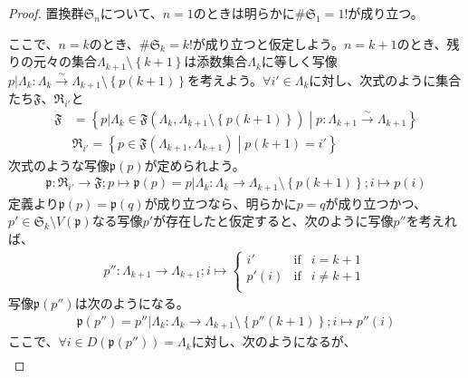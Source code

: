 \documentclass[dvipdfmx]{jsarticle}
\begin{document}
\begin{proof}
置換群$\mathfrak{S}_{n}$について、$n = 1$のときは明らかに${\#}\mathfrak{S}_{1} = 1!$が成り立つ。\par
ここで、$n = k$のとき、${\#}\mathfrak{S}_{k} = k!$が成り立つと仮定しよう。$n = k + 1$のとき、残りの元々の集合$\varLambda_{k + 1} \setminus \left\{ k + 1 \right\}$は添数集合$\varLambda_{k}$に等しく写像$p|\varLambda_{k}:\varLambda_{k}\overset{\sim}{\rightarrow}\varLambda_{k + 1} \setminus \left\{ p(k + 1) \right\}$を考えよう。$\forall i' \in \varLambda_{k}$に対し、次式のように集合たち$\mathfrak{F}$、$\mathfrak{R}_{i'}$と
\begin{align*}
\mathfrak{F} &= \left\{ p|\varLambda_{k}\in \mathfrak{F}\left( \varLambda_{k},\varLambda_{k + 1} \setminus \left\{ p(k + 1) \right\} \right) \middle| p:\varLambda_{k + 1}\overset{\sim}{\rightarrow}\varLambda_{k + 1} \right\}\\
&\mathfrak{R}_{i'} = \left\{ p \in \mathfrak{F}\left( \varLambda_{k + 1},\varLambda_{k + 1} \right) \middle| p(k + 1) = i' \right\}
\end{align*}
次式のような写像$\mathfrak{p}(p)$が定められよう。
\begin{align*}
\mathfrak{p:}\mathfrak{R}_{i'}\mathfrak{\rightarrow F;}p \mapsto \mathfrak{p}(p) = p|\varLambda_{k}:\varLambda_{k} \rightarrow \varLambda_{k + 1} \setminus \left\{ p(k + 1) \right\};i \mapsto p(i)
\end{align*}
定義より$\mathfrak{p}(p) = \mathfrak{p}(q)$が成り立つなら、明らかに$p = q$が成り立つかつ、$p' \in \mathfrak{S}_{k} \setminus V\left( \mathfrak{p} \right)$なる写像$p'$が存在したと仮定すると、次のように写像$p''$を考えれば、
\begin{align*}
p'':\varLambda_{k + 1} \rightarrow \varLambda_{k + 1};i \mapsto \left\{ \begin{matrix}
i' & \mathrm{if} & i = k + 1 \\
p'(i) & \mathrm{if} & i \neq k + 1 \\
\end{matrix} \right.\ 
\end{align*}
写像$\mathfrak{p}\left( p'' \right)$は次のようになる。
\begin{align*}
\mathfrak{p}\left( p'' \right) = p''|\varLambda_{k}:\varLambda_{k} \rightarrow \varLambda_{k + 1} \setminus \left\{ p''(k + 1) \right\};i \mapsto p''(i)
\end{align*}
ここで、$\forall i \in D\left( \mathfrak{p}\left( p'' \right) \right) = \varLambda_{k}$に対し、次のようになるが、
\begin{align*}

\end{align*}
\end{proof}
\end{document}
